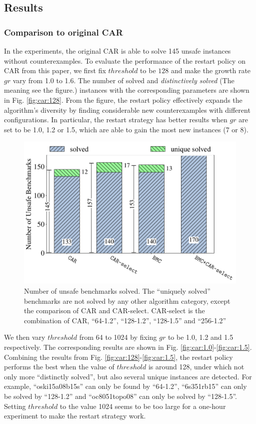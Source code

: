 \subsection{Results}

\subsubsection{Comparison to original CAR}
In the experiments, the original CAR is able to solve 145 unsafe instances without counterexamples.
To evaluate the performance of the restart policy on CAR from this paper, we first fix $threshold$ to be $128$ and make the growth rate $gr$ vary from 1.0 to 1.6. The number of solved and \emph{distinctively solved} (The meaning see the figure.) instances with the corresponding parameters are shown in Fig. \ref{fig:car:128}. From the figure, the restart policy effectively expands the algorithm's diversity by finding considerable new counterexamples with different configurations. In particular, the restart strategy has better results when $gr$ are set to be 1.0, 1.2 or 1.5, which are able to gain the most new instances (7 or 8). 
\begin{figure}[!t]
\centering
\includegraphics[width=\linewidth]{images/car-bmc.pdf} 
\caption{Number of unsafe benchmarks solved. The “uniquely solved” benchmarks are not solved by any other algorithm category, except the comparison of CAR and CAR-select. CAR-select is the combination of CAR, ``64-1.2'', ``128-1.2'', ``128-1.5'' and ``256-1.2''}\label{fig:compare}
\end{figure}

We then vary $threshold$ from 64 to 1024 by fixing $gr$ to be 1.0, 1.2 and 1.5 respectively. The corresponding results are shown in 
Fig. \ref{fig:car:1.0}-\ref{fig:car:1.5}. Combining the results from Fig. \ref{fig:car:128}-\ref{fig:car:1.5}, the restart policy performs the best when the value of $threshold$ is around 128, under which not only more ``distinctly solved'', but also several unique instances are detected. For example, ``oski15a08b15s'' can only be found by ``64-1.2'', ``6s351rb15'' can only be solved by ``128-1.2'' and ``oc8051topo08'' can only be solved by ``128-1.5''. Setting $threshold$ to the value 1024 seems to be too large for a one-hour experiment to make the restart strategy work. 


